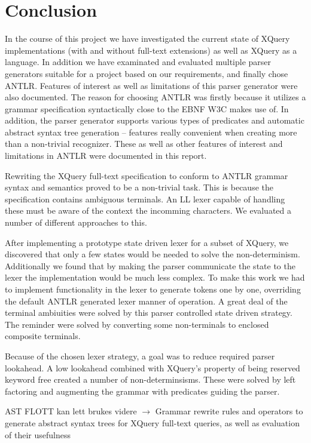 \chapter{Conclusion}
\label{chapter:conclusion}

In the course of this project we have investigated the current state of XQuery implementations (with and without full-text extensions) as well as XQuery as a language. In addition we have examinated and evaluated multiple parser generators suitable for a project based on our requirements, and finally chose ANTLR. Features of interest as well as limitations of this parser generator were also documented.
The reason for choosing ANTLR was firstly because it utilizes a grammar specification syntactically close to the EBNF W3C makes use of. In addition, the parser generator supports various types of predicates and automatic abstract syntax tree generation -- features really convenient when creating more than a non-trivial recognizer. These as well as other features of interest and limitations in ANTLR were documented in this report.

Rewriting the XQuery full-text specification to conform to ANTLR grammar syntax and semantics proved to be a non-trivial task. This is because the specification contains ambiguous terminals. An LL lexer capable of handling these must be aware of the context the incomming characters. We evaluated a number of different approaches to this. 

After implementing a prototype state driven lexer for a subset of XQuery, we discovered that only a few states would be needed to solve the non-determinism. Additionally we found that by making the parser communicate the state to the lexer the implementation would be much less complex. To make this work we had to implement functionality in the lexer to generate tokens one by one, overriding the default ANTLR generated lexer manner of operation. A great deal of the terminal ambiuities were solved by this parser controlled state driven strategy. The reminder were solved by converting some non-terminals to enclosed composite terminals.

Because of the chosen lexer strategy, a goal was to reduce required parser lookahead. A low lookahead combined with XQuery's property of being reserved keyword free created a number of non-determinsisms. These were solved by left factoring and augmenting the grammar with predicates guiding the parser.

AST FLOTT kan lett brukes videre $\rightarrow$ Grammar rewrite rules and operators to generate abstract syntax trees for XQuery full-text queries, as well as evaluation of their usefulness

